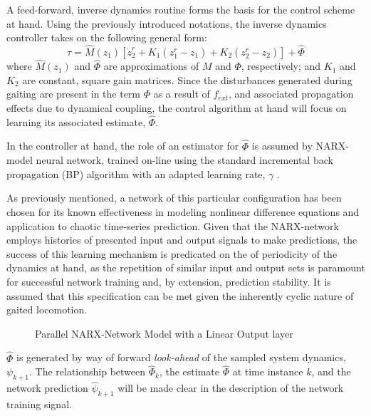 
A feed-forward, inverse dynamics routine forms the basis for the control scheme at hand. 
Using the previously introduced notations, the inverse dynamics controller takes on the following general form:
	\begin{equation}
		\tau = \hat{M}(z_{1})[ \dot{z}_{2}^{r} + K_{1}(z_{1}^{r}-z_{1}) + K_{2}(z_{2}^{r}-z_{2}) ] + \hat{\Phi}
		\label{eq::inverse_dynamics}
	\end{equation}
where $\hat{M}(z_{1})$ and $\hat{\Phi}$ are approximations of $M$ and $\Phi$, respectively; and $K_{1}$ and $K_{2}$ are constant, square 
gain matrices. Since the disturbances generated during gaiting are present in the term $\Phi$ as a result of $f_{ext}$, and associated
propagation effects due to dynamical coupling, the control algorithm at hand will focus on learning its associated estimate, $\hat{\Phi}$.

In the controller at hand, the role of an estimator for $\hat{\Phi}$ is assumed by NARX-model neural network, trained on-line 
using the standard incremental back propagation (BP) algorithm with an adapted learning rate, $\gamma$  \cite{Rumelhart1988,Rumelhart1995}.

As previously mentioned, a network of this particular configuration has been chosen for its known effectiveness in modeling nonlinear difference 
equations and application to chaotic time-series prediction. Given that the NARX-network employs histories of presented input and output signals to 
make predictions, the success of this learning  mechanism is predicated on the of periodicity of the dynamics at hand, as the 
repetition of similar input and output sets is paramount for successful network training and, by extension, prediction stability. It is assumed 
that this specification can be met given the inherently cyclic nature of gaited locomotion. 
	\begin{figure}[t!]
		\centering
		\caption{Parallel NARX-Network Model with a Linear Output layer}
		\label{fig::narx_net}
	\end{figure}
$\hat{\Phi}$ is generated by way of forward \emph{look-ahead} of the sampled system dynamics, $\psi_{k+1}$. 
The relationship between $\hat{\Phi}_{k}$, the estimate $\hat{\Phi}$ at time instance $k$,  and the network prediction $\hat{\psi}_{k+1}$
will be made clear in the description of the network training signal. 

